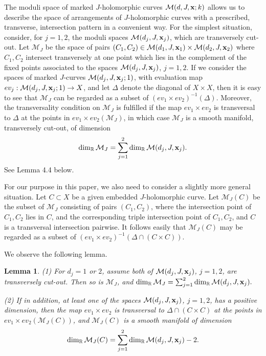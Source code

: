 \documentclass[11pt]{amsart}
\theoremstyle{plain}
\numberwithin{theorem}{section}
\newtheorem{lemma}[theorem]{Lemma}
\theoremstyle{definition}
\newcommand{\R}{{\mathbb R}}
\newcommand{\M}{{\mathcal M}}
\begin{document}
The moduli space of marked $J$-holomorphic curves $\M(d,J, {\bf x}; k)$ allows us to describe the space of arrangements of $J$-holomorphic curves with a prescribed, transverse, intersection pattern
in a convenient way. For the simplest situation, consider, for $j=1,2$, the moduli spaces 
$\M(d_j,J, {\bf x}_j)$, which are transversely cut-out. Let $\M_J$ be the space of pairs 
$(C_1,C_2)\in \M(d_1,J, {\bf x}_1)\times \M(d_2,J, {\bf x}_2)$ where $C_1,C_2$ intersect transversely at one point which lies in the complement of the fixed points associated to the spaces 
$\M(d_j,J, {\bf x}_j)$, $j=1,2$. If we consider the spaces of marked $J$-curves $\M(d_j,J,{\bf x}_j; 1)$, with evaluation map $ev_j: \M(d_j,J,{\bf x}_j; 1) \rightarrow X$, and let $\Delta$ denote the diagonal of $X\times X$, 
then it is easy to see that $\M_J$ can be regarded as a subset of $(ev_1\times ev_2)^{-1}(\Delta)$.
Moreover, the transversality condition on $\M_J$ is fulfilled if the map $ev_1\times ev_2$ is transversal to $\Delta$ at the points in $ev_1\times ev_2(\M_J)$, in which case $\M_J$ is a smooth manifold, transversely cut-out, of dimension 
$$
\dim_\R \M_J=\sum_{j=1}^2 \dim_\R \M(d_j,J,{\bf x}_j).
$$
See Lemma 4.4 below. 

For our purpose in this paper, we also need to consider a slightly more general situation. Let 
$C\subset X$ be a given embedded $J$-holomorphic curve. Let $\M_J(C)$ be the subset of $\M_J$
consisting of pairs $(C_1,C_2)$, where the intersection point of $C_1,C_2$ lies in $C$, and the corresponding triple intersection point of $C_1,C_2$, and $C$ is a transversal intersection pairwise. It follows easily that
$\M_J(C)$ may be regarded as a subset of $(ev_1\times ev_2)^{-1}(\Delta\cap (C\times C))$. 

We observe the following lemma.

\begin{lemma}
(1) For $d_j=1$ or $2$, assume both of $\M(d_j,J, {\bf x}_j)$, $j=1,2$, are transversely cut-out. Then so is $\M_J$,
and $\dim_\R \M_J=\sum_{j=1}^2 \dim_\R \M(d_j,J,{\bf x}_j).$

(2) If in addition, at least one of the spaces $\M(d_j,J, {\bf x}_j)$, $j=1,2$, has a positive dimension, then the map $ev_1\times ev_2$ is transversal to $\Delta\cap (C\times C)$ at the points in $ev_1\times ev_2(\M_J(C))$, and 
$\M_J(C)$ is a smooth manifold of dimension 
$$
\dim_\R \M_J(C)=\sum_{j=1}^2 \dim_\R \M(d_j,J,{\bf x}_j)-2.
$$
\end{lemma}
\end{document}
